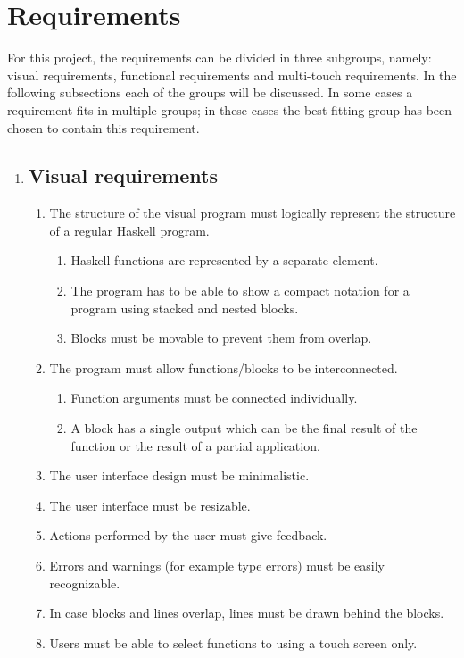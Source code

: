 \section{Requirements}

For this project, the requirements can be divided in three subgroups, namely: visual requirements, functional requirements and multi-touch requirements. In the following subsections each of the groups will be discussed. In some cases a requirement fits in multiple groups; in these cases the best fitting group has been chosen to contain this requirement.

\begin{enumerate}
\item \subsection*{Visual requirements} 

\begin{enumerate}
	\item The structure of the visual program must logically represent the structure of a regular Haskell program.
		\begin{enumerate}
			\item Haskell functions are represented by a separate element.
			\item The program has to be able to show a compact notation for a program using stacked and nested blocks.
			\item Blocks must be movable to prevent them from overlap.
		\end{enumerate}
	\item The program must allow functions/blocks to be interconnected.
		\begin{enumerate}
			\item Function arguments must be connected individually.
			\item A block has a single output which can be the final result of the function or the result of a partial application.
		\end{enumerate}
	\item The user interface design must be minimalistic.
	\item The user interface must be resizable.
	\item Actions performed by the user must give feedback.
	\item Errors and warnings (for example type errors) must be easily recognizable.
	\item In case blocks and lines overlap, lines must be drawn behind the blocks.
	\item Users must be able to select functions to using a touch screen only.
\end{enumerate}


\end{enumerate}
